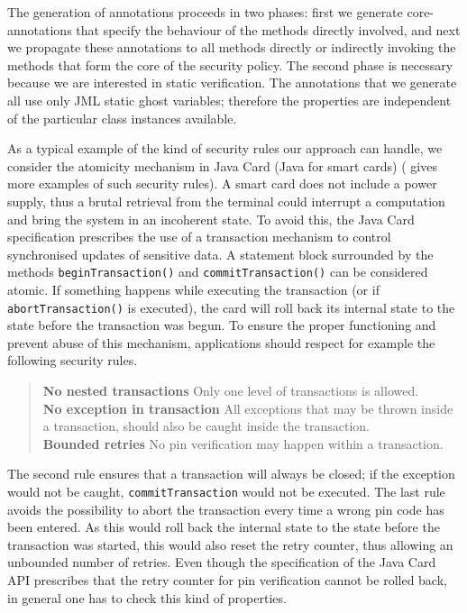 The generation of annotations proceeds in two phases: first we
generate core-annotations that specify the behaviour of the methods
directly involved, and next we propagate these annotations to all
methods directly or indirectly invoking the methods that form the core
of the security policy. The second phase is necessary because we are
interested in static verification. The annotations that we generate
all use only JML static ghost variables; therefore the properties are
independent of the particular class instances available. 

As a typical example of the kind of security rules our approach can
handle, we consider the atomicity mechanism in Java Card (Java for
smart cards) (\cite{PavlovaBBHL04} gives more examples of such
security rules). A smart card does not include a power supply, thus a
brutal retrieval from the terminal could interrupt a computation and
bring the system in an incoherent state. To avoid this, the Java Card
specification prescribes the use of a transaction mechanism to control
synchronised updates of sensitive data. A statement block surrounded
by the methods \texttt{beginTransaction()} and
\texttt{commitTransaction()} can be considered atomic.
If something happens while executing the transaction (or if
\texttt{abortTransaction()} is executed), the card will
roll back its internal state to the state before the transaction was
begun. To ensure the proper functioning and prevent abuse of this
mechanism, applications should respect for example the following
security rules. 

\begin{quote}
\textbf{No nested transactions} Only one level of transactions
is allowed.\smallskip\\
\textbf{No exception in transaction} All exceptions that may be thrown
inside a transaction, should also be caught inside the
transaction.\smallskip\\
\textbf{Bounded retries}
No pin verification may happen within a transaction.
\end{quote} 
The second rule ensures that a transaction will always be closed;
if the exception would not be caught, \texttt{commitTransaction}
would not be executed. The last rule avoids the possibility to abort
the transaction every time a wrong pin code has been entered. As this
would roll back the internal state to the state before the transaction
was started, this would also reset the retry counter, thus allowing an
unbounded number of retries. Even though the specification of the Java
Card API prescribes that the retry counter for pin verification cannot
be rolled back, in general one has to check this kind of properties.

